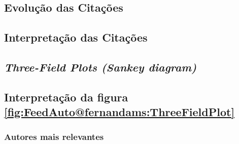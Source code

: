 
\subsection{Evolução das Citações}

\subsection{Interpretação das Citações}

\subsection{\textit{Three-Field Plots (Sankey diagram)} \label{FeedAuto:Sankey}}





\subsection{Interpretação da figura \ref{fig:FeedAuto@fernandams:ThreeFieldPlot}}

\subsubsection{Autores mais relevantes\label{FeedAuto:Sankey:AutoresRelevantes}}
